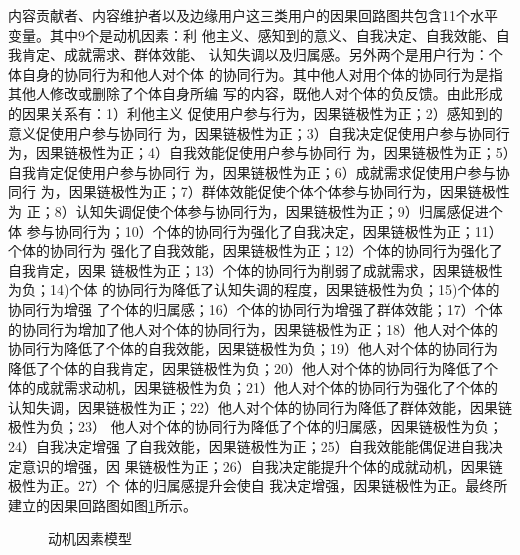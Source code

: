 内容贡献者、内容维护者以及边缘用户这三类用户的因果回路图共包含11个水平
变量。其中9个是动机因素：利
他主义、感知到的意义、自我决定、自我效能、自我肯定、成就需求、群体效能、
认知失调以及归属感。另外两个是用户行为：个体自身的协同行为和他人对个体
的协同行为。其中他人对用个体的协同行为是指其他人修改或删除了个体自身所编
写的内容，既他人对个体的负反馈。由此形成的因果关系有：1）利他主义
促使用户参与行为，因果链极性为正；2）感知到的意义促使用户参与协同行
为，因果链极性为正；3）自我决定促使用户参与协同行
为，因果链极性为正；4）自我效能促使用户参与协同行
为，因果链极性为正；5）自我肯定促使用户参与协同行
为，因果链极性为正；6）成就需求促使用户参与协同行
为，因果链极性为正；7）群体效能促使个体个体参与协同行为，因果链极性为
正；8）认知失调促使个体参与协同行为，因果链极性为正；9）归属感促进个体
参与协同行为；10）个体的协同行为强化了自我决定，因果链极性为正；11）个体的协同行为
强化了自我效能，因果链极性为正；12）个体的协同行为强化了自我肯定，因果
链极性为正；13）个体的协同行为削弱了成就需求，因果链极性为负；14)个体
的协同行为降低了认知失调的程度，因果链极性为负；15)个体的协同行为增强
了个体的归属感；16）个体的协同行为增强了群体效能；17）个体
的协同行为增加了他人对个体的协同行为，因果链极性为正；18）他人对个体的
协同行为降低了个体的自我效能，因果链极性为负；19）他人对个体的协同行为
降低了个体的自我肯定，因果链极性为负；20）他人对个体的协同行为降低了个
体的成就需求动机，因果链极性为负；21）他人对个体的协同行为强化了个体的
认知失调，因果链极性为正；22）他人对个体的协同行为降低了群体效能，因果链极性为负；23）
他人对个体的协同行为降低了个体的归属感，因果链极性为负；24）自我决定增强
了自我效能，因果链极性为正；25）自我效能能偶促进自我决定意识的增强，因
果链极性为正；26）自我决定能提升个体的成就动机，因果链极性为正。27）个
体的归属感提升会使自
我决定增强，因果链极性为正。最终所
建立的因果回路图如图\ref{fig:motive2}所示。

\begin{figure}[htb]
  \centering
  \caption{\small{动机因素模型}}
  \label{fig:motive2}
\end{figure}

